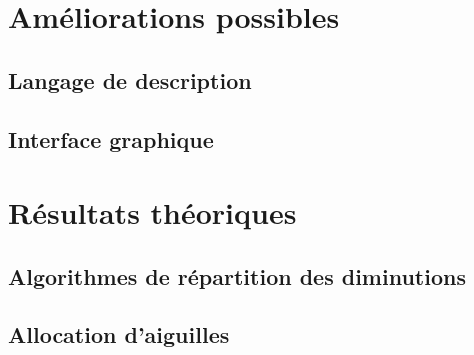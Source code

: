 \documentclass{article}
\begin{document}




\section{Améliorations possibles}


\subsection{Langage de description}

\subsection{Interface graphique}



\section{Résultats théoriques}

\subsection{Algorithmes de répartition des diminutions}

\subsection{Allocation d'aiguilles}
\end{document}
